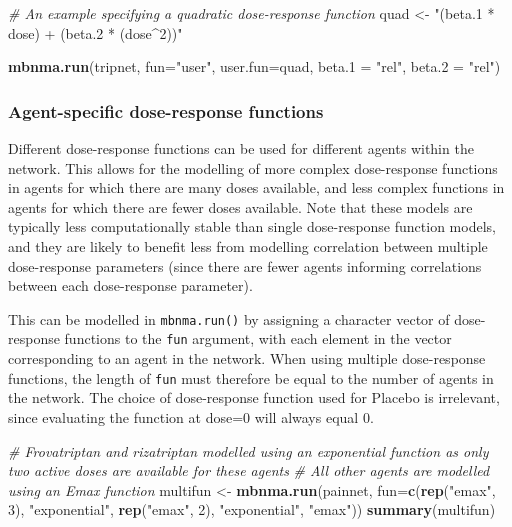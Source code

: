 \documentclass[]{article}
\newenvironment{Shaded}{\begin{snugshade}}{\end{snugshade}}
\newcommand{\CommentTok}[1]{\textcolor[rgb]{0.56,0.35,0.01}{\textit{#1}}}
\newcommand{\DataTypeTok}[1]{\textcolor[rgb]{0.13,0.29,0.53}{#1}}
\newcommand{\DecValTok}[1]{\textcolor[rgb]{0.00,0.00,0.81}{#1}}
\newcommand{\KeywordTok}[1]{\textcolor[rgb]{0.13,0.29,0.53}{\textbf{#1}}}
\newcommand{\NormalTok}[1]{#1}
\newcommand{\StringTok}[1]{\textcolor[rgb]{0.31,0.60,0.02}{#1}}
\begin{document}
\begin{Shaded}
\begin{Highlighting}[]
\CommentTok{# An example specifying a quadratic dose-response function}
\NormalTok{quad <-}\StringTok{ "(beta.1 * dose) + (beta.2 * (dose^2))"}

\KeywordTok{mbnma.run}\NormalTok{(tripnet, }\DataTypeTok{fun=}\StringTok{"user"}\NormalTok{, }\DataTypeTok{user.fun=}\NormalTok{quad, }
          \DataTypeTok{beta.1 =} \StringTok{"rel"}\NormalTok{, }\DataTypeTok{beta.2 =} \StringTok{"rel"}\NormalTok{)}
\end{Highlighting}
\end{Shaded}

\hypertarget{agent-specific-dose-response-functions}{%
\subsubsection{Agent-specific dose-response
functions}\label{agent-specific-dose-response-functions}}

Different dose-response functions can be used for different agents
within the network. This allows for the modelling of more complex
dose-response functions in agents for which there are many doses
available, and less complex functions in agents for which there are
fewer doses available. Note that these models are typically less
computationally stable than single dose-response function models, and
they are likely to benefit less from modelling correlation between
multiple dose-response parameters (since there are fewer agents
informing correlations between each dose-response parameter).

This can be modelled in \texttt{mbnma.run()} by assigning a character
vector of dose-response functions to the \texttt{fun} argument, with
each element in the vector corresponding to an agent in the network.
When using multiple dose-response functions, the length of \texttt{fun}
must therefore be equal to the number of agents in the network. The
choice of dose-response function used for Placebo is irrelevant, since
evaluating the function at dose=0 will always equal 0.

\begin{Shaded}
\begin{Highlighting}[]
\CommentTok{# Frovatriptan and rizatriptan modelled using an exponential function as only two active doses are available for these agents}
\CommentTok{# All other agents are modelled using an Emax function}
\NormalTok{multifun <-}\StringTok{ }\KeywordTok{mbnma.run}\NormalTok{(painnet, }\DataTypeTok{fun=}\KeywordTok{c}\NormalTok{(}\KeywordTok{rep}\NormalTok{(}\StringTok{"emax"}\NormalTok{, }\DecValTok{3}\NormalTok{), }\StringTok{"exponential"}\NormalTok{, }\KeywordTok{rep}\NormalTok{(}\StringTok{"emax"}\NormalTok{, }\DecValTok{2}\NormalTok{), }\StringTok{"exponential"}\NormalTok{, }\StringTok{"emax"}\NormalTok{))}
\KeywordTok{summary}\NormalTok{(multifun)}
\end{Highlighting}
\end{Shaded}
\end{document}
